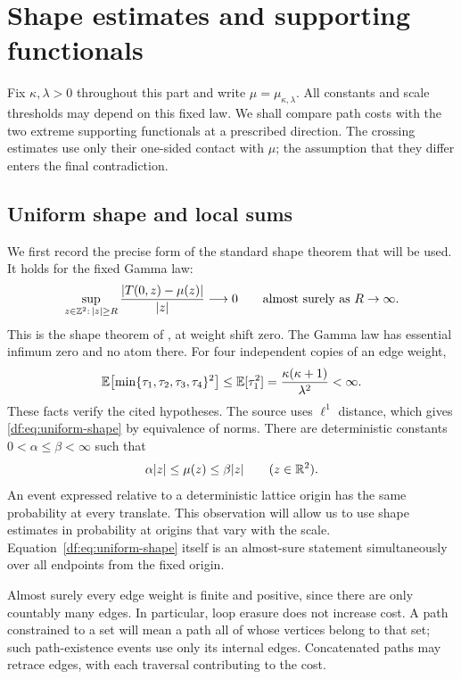 \section{Shape estimates and supporting functionals}
\label{df:sec:setup}

Fix $\kappa,\lambda>0$ throughout this part and write
$\mu=\mu_{\kappa,\lambda}$. All constants and scale thresholds may
depend on this fixed law. We shall compare path costs with the two
extreme supporting functionals at a prescribed direction. The crossing
estimates use only their one-sided contact with $\mu$; the assumption
that they differ enters the final contradiction.

\subsection{Uniform shape and local sums}

We first record the precise form of the standard shape theorem that
will be used. It holds for the fixed Gamma law:
\begin{equation}\label{df:eq:uniform-shape}
 \sup_{z\in\mathbb Z^2:\,|z|\ge R}
 \frac{|T(0,z)-\mu(z)|}{|z|}\longrightarrow0
 \qquad\text{almost surely as }R\to\infty.
\end{equation}
This is the shape theorem of
\cite[Theorem~A.1 and Equation~(A.3)]{KRS23}, at weight shift zero.
The Gamma law has essential infimum zero and no atom there. For
four independent copies of an edge weight,
\[
 \mathbb E\!\left[\min\{\tau_1,\tau_2,\tau_3,\tau_4\}^2\right]
 \le \mathbb E[\tau_1^2]
 =\frac{\kappa(\kappa+1)}{\lambda^2}<\infty.
\]
These facts verify the cited hypotheses. The source uses $\ell^1$
distance, which gives \eqref{df:eq:uniform-shape} by equivalence of
norms. There are deterministic constants $0<\alpha\le\beta<\infty$ such that
\begin{equation}\label{df:eq:norm-bounds}
 \alpha|z|\le\mu(z)\le\beta|z|\qquad(z\in\mathbb R^2).
\end{equation}
An event expressed relative to a deterministic lattice origin has the
same probability at every translate. This observation will allow us to
use shape estimates in probability at origins that vary with the
scale. Equation~\eqref{df:eq:uniform-shape} itself is an almost-sure
statement simultaneously over all endpoints from the fixed origin.

Almost surely every edge weight is finite and positive, since there
are only countably many edges. In particular, loop erasure does not
increase cost. A path constrained to a set will mean a path all of
whose vertices belong to that set; such path-existence events use
only its internal edges. Concatenated paths may retrace edges, with
each traversal contributing to the cost.

